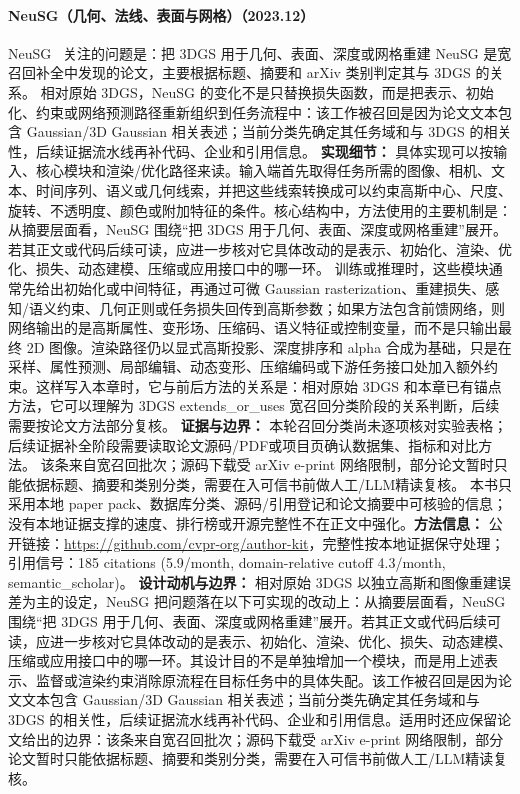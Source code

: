 \paragraph{NeuSG（几何、法线、表面与网格）（2023.12）}
NeuSG~\cite{2312_00846} 关注的问题是：把 3DGS 用于几何、表面、深度或网格重建 NeuSG 是宽召回补全中发现的论文，主要根据标题、摘要和 arXiv 类别判定其与 3DGS 的关系。
相对原始 3DGS，NeuSG 的变化不是只替换损失函数，而是把表示、初始化、约束或网络预测路径重新组织到任务流程中：该工作被召回是因为论文文本包含 Gaussian/3D Gaussian 相关表述；当前分类先确定其任务域和与 3DGS 的相关性，后续证据流水线再补代码、企业和引用信息。
\textbf{实现细节：} 具体实现可以按输入、核心模块和渲染/优化路径来读。输入端首先取得任务所需的图像、相机、文本、时间序列、语义或几何线索，并把这些线索转换成可以约束高斯中心、尺度、旋转、不透明度、颜色或附加特征的条件。核心结构中，方法使用的主要机制是：从摘要层面看，NeuSG 围绕“把 3DGS 用于几何、表面、深度或网格重建”展开。若其正文或代码后续可读，应进一步核对它具体改动的是表示、初始化、渲染、优化、损失、动态建模、压缩或应用接口中的哪一环。 训练或推理时，这些模块通常先给出初始化或中间特征，再通过可微 Gaussian rasterization、重建损失、感知/语义约束、几何正则或任务损失回传到高斯参数；如果方法包含前馈网络，则网络输出的是高斯属性、变形场、压缩码、语义特征或控制变量，而不是只输出最终 2D 图像。渲染路径仍以显式高斯投影、深度排序和 alpha 合成为基础，只是在采样、属性预测、局部编辑、动态变形、压缩编码或下游任务接口处加入额外约束。这样写入本章时，它与前后方法的关系是：相对原始 3DGS 和本章已有锚点方法，它可以理解为 3DGS extends\_or\_uses 宽召回分类阶段的关系判断，后续需要按论文方法部分复核。
\textbf{证据与边界：} 本轮召回分类尚未逐项核对实验表格；后续证据补全阶段需要读取论文源码/PDF或项目页确认数据集、指标和对比方法。 该条来自宽召回批次；源码下载受 arXiv e-print 网络限制，部分论文暂时只能依据标题、摘要和类别分类，需要在入可信书前做人工/LLM精读复核。 本书只采用本地 paper pack、数据库分类、源码/引用登记和论文摘要中可核验的信息；没有本地证据支撑的速度、排行榜或开源完整性不在正文中强化。\textbf{方法信息：} 公开链接：\url{https://github.com/cvpr-org/author-kit}，完整性按本地证据保守处理；引用信号：185 citations (5.9/month, domain-relative cutoff 4.3/month, semantic\_scholar)。
\textbf{设计动机与边界：} 相对原始 3DGS 以独立高斯和图像重建误差为主的设定，NeuSG 把问题落在以下可实现的改动上：从摘要层面看，NeuSG 围绕“把 3DGS 用于几何、表面、深度或网格重建”展开。若其正文或代码后续可读，应进一步核对它具体改动的是表示、初始化、渲染、优化、损失、动态建模、压缩或应用接口中的哪一环。其设计目的不是单独增加一个模块，而是用上述表示、监督或渲染约束消除原流程在目标任务中的具体失配。该工作被召回是因为论文文本包含 Gaussian/3D Gaussian 相关表述；当前分类先确定其任务域和与 3DGS 的相关性，后续证据流水线再补代码、企业和引用信息。适用时还应保留论文给出的边界：该条来自宽召回批次；源码下载受 arXiv e-print 网络限制，部分论文暂时只能依据标题、摘要和类别分类，需要在入可信书前做人工/LLM精读复核。
